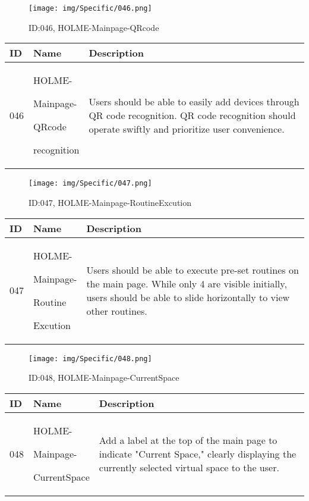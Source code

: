 \documentclass[conference]{IEEEtran}
\begin{document}
\begin{enumerate}
\begin{figure}[h]
\centering
\texttt{[image: img/Specific/046.png]}
\caption{ID:046, HOLME-Mainpage-QRcode}
\end{figure}
\begin{table}[h]
\def\arraystretch{1.2} \small
    \begin{tabular}{|p{1cm}|p{1.8cm}|p{5.0cm}|}
        \hline
        ID & Name & Description\\ \hline
         046 \par  & HOLME-\par Mainpage-\par QRcode \par recognition &Users should be able to easily add devices through QR code recognition. QR code recognition should operate swiftly and prioritize user convenience.\\ \hline
    \end{tabular}
\end{table}

\begin{figure}[h]
\centering
\texttt{[image: img/Specific/047.png]}
\caption{ID:047, HOLME-Mainpage-RoutineExcution}
\end{figure}
\begin{table}[h]
\def\arraystretch{1.2} \small
    \begin{tabular}{|p{1cm}|p{1.8cm}|p{5.0cm}|}
        \hline
        ID & Name & Description\\ \hline
         047 \par  & HOLME-\par Mainpage-\par Routine \par Excution &Users should be able to execute pre-set routines on the main page. While only 4 are visible initially, users should be able to slide horizontally to view other routines.\\ \hline
    \end{tabular}
\end{table}

\begin{figure}[h]
\centering
\texttt{[image: img/Specific/048.png]}
\caption{ID:048, HOLME-Mainpage-CurrentSpace}
\end{figure}
\begin{table}[h]
\def\arraystretch{1.2} \small
    \begin{tabular}{|p{1cm}|p{1.8cm}|p{5.0cm}|}
        \hline
        ID & Name & Description\\ \hline
         048 \par  & HOLME-\par Mainpage-\par CurrentSpace &Add a label at the top of the main page to indicate "Current Space," clearly displaying the currently selected virtual space to the user.\\ \hline
    \end{tabular}
\end{table}


\end{enumerate}
\end{document}
